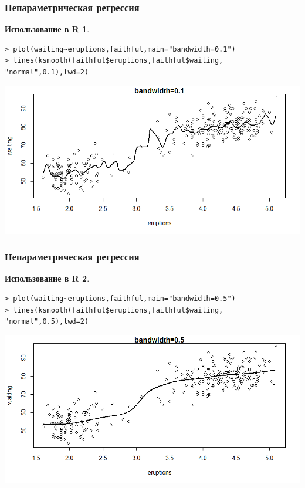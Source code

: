 \documentclass{beamer}
\newtheorem{exmpr}{Использование в R}
\begin{document}
\begin{frame}[containsverbatim]
\frametitle{Непараметрическая регрессия}
\begin{exmpr}
\begin{verbatim}
> plot(waiting~eruptions,faithful,main="bandwidth=0.1")
> lines(ksmooth(faithful$eruptions,faithful$waiting,
"normal",0.1),lwd=2)
\end{verbatim}
\end{exmpr}
\includegraphics[width=1\textwidth,height=0.6\textheight]{ksmoothplot1.png}
\end{frame}

\begin{frame}[containsverbatim]
\frametitle{Непараметрическая регрессия}
\begin{exmpr}
\begin{verbatim}
> plot(waiting~eruptions,faithful,main="bandwidth=0.5")
> lines(ksmooth(faithful$eruptions,faithful$waiting,
"normal",0.5),lwd=2)
\end{verbatim}
\end{exmpr}
\includegraphics[width=1\textwidth,height=0.6\textheight]{ksmoothplot2.png}
\end{frame}
\end{document}
